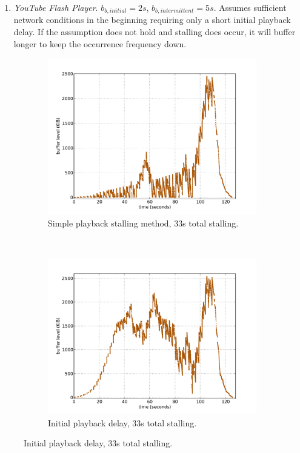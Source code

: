 \begin{enumerate}
\item \textit{YouTube Flash Player}. $b_{b,initial}=2s$, $b_{b,intermittent}=5s$. Assumes sufficient network conditions in the beginning requiring only a short initial playback delay. If the assumption does not hold and stalling does occur, it will buffer longer to keep the occurrence frequency down.
\end{enumerate}


\begin{figure}
	\centering
    	\begin{subfigure}[b]{0.50\textwidth}
                \centering
                \includegraphics[width=\textwidth]{images/expose/bufferlevel-stall-new.pdf}
                \caption{Simple playback stalling method, 33s total stalling.}
                \label{fig:expose-bufferlevel-stall}
        \end{subfigure}%
        ~
    	\begin{subfigure}[b]{0.50\textwidth}
                \centering
                \includegraphics[width=\textwidth]{images/expose/bufferlevel-startdelay-new.pdf}
                \caption{Initial playback delay, 33s total stalling.}
                \label{fig:expose-bufferlevel-startdelay}
        \end{subfigure}


\end{figure}

